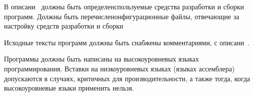 \label{R.DI.Tools}
В описани~ должны быть 
определенспользуемые средства разработки и сборки программ. 
Должны быть перечисленонфигурационные файлы, отвечающие за 
настройку средств разработки и сборки

\label{R.DI.Comments}
Исходные тексты программ должны быть снабжены комментариями,
 с описани~.

\label{R.DI.Language}
Программы должны быть написаны на высокоуровневых языках программирования.
Вставки на низкоуровневых языках (языках ассемблера) допускаются в случаях,
критичных для производительности, а также тогда, когда высокоуровневые языки
применить нельзя.

\begin{note*}
\end{note*}


